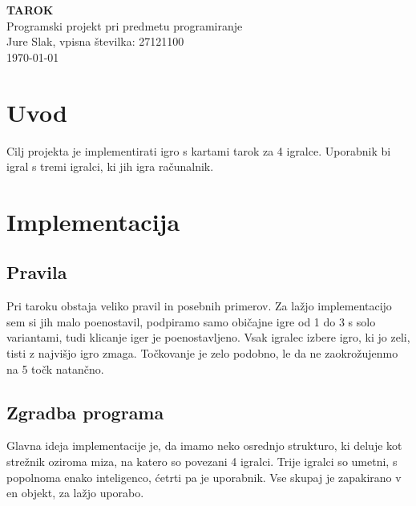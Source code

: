 \documentclass{article}
\begin{document}
\begin{center}
{\bf \Huge TAROK} \\[24pt]
{\Large Programski projekt pri predmetu programiranje} \\[12pt]
{\Large Jure Slak, vpisna številka: 27121100} \\[12pt]
\today
\end{center}

\tableofcontents

\section{Uvod}
Cilj projekta je implementirati igro s kartami tarok za 4 igralce. Uporabnik bi igral s tremi igralci, ki jih igra računalnik.

\section{Implementacija}
\subsection{Pravila}
Pri taroku obstaja veliko pravil in posebnih primerov. Za lažjo implementacijo sem si jih malo poenostavil, podpiramo samo običajne igre od 1 do 3 s solo variantami, tudi klicanje iger je poenostavljeno. Vsak igralec izbere igro, ki jo zeli, tisti z najvišjo igro zmaga. Točkovanje je zelo podobno, le da ne zaokrožujenmo na 5 točk natančno.

\subsection{Zgradba programa}
Glavna ideja implementacije je, da imamo neko osrednjo strukturo, ki deluje kot strežnik oziroma miza, na katero so povezani 4 igralci. Trije igralci so umetni, s popolnoma enako inteligenco, ćetrti pa je uporabnik. Vse skupaj je zapakirano v en objekt, za lažjo uporabo.
\end{document}
